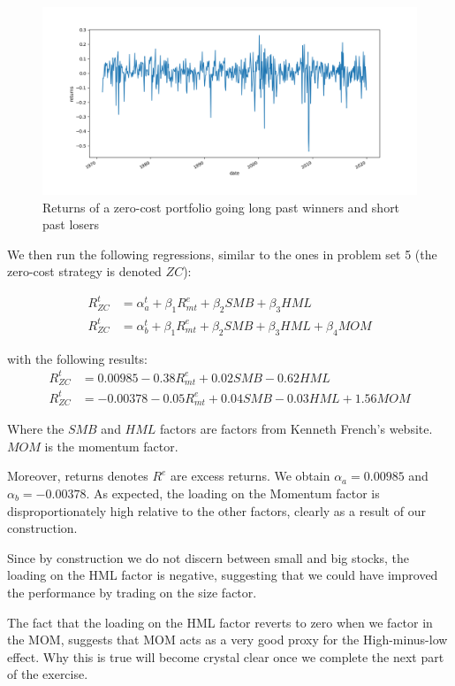 \documentclass[10pt]{article}
\begin{document}
\begin{figure}[h]
    \centering
    \includegraphics[scale=0.5]{ps8_ex2_plot1.png}
    \caption{Returns of a zero-cost portfolio going long past winners and short past losers}
    \label{ps8_ex2_plot1}    
\end{figure}

We then run the following regressions, similar to the ones in problem set 5 (the zero-cost strategy is denoted $ZC$):

\begin{align*}	
	R^t_{ZC} &= \alpha^t_a +  \beta_1 R^e_{mt} + \beta_2 SMB + \beta_3 HML \\
	R^t_{ZC}  &= \alpha^t_b + \beta_1 R^e_{mt} + \beta_2 SMB + \beta_3 HML + \beta_4 MOM
\end{align*}  

with the following results:
\begin{align*}	
	R^t_{ZC} &= 0.00985 - 0.38 R^e_{mt} + 0.02 SMB -0.62 HML \\
	R^t_{ZC}  &= -0.00378 -0.05 R^e_{mt} + 0.04 SMB -0.03 HML + 1.56 MOM
\end{align*}  

Where the $SMB$ and $HML$ factors are factors from Kenneth French’s website.
$MOM$ is the momentum factor.

Moreover, returns denotes $R^e$ are excess returns. We obtain $\alpha_{a} = 0.00985$ and $\alpha_{b} = -0.00378$.   
As expected, the loading on the Momentum factor is disproportionately high
relative to the other factors, clearly as a result of our construction.

Since by construction we do not discern between small and big stocks, the
loading on the HML factor is negative, suggesting that we could have improved
the performance by trading on the size factor.

The fact
that the loading on the HML factor reverts to zero when we factor in the MOM,
suggests that MOM acts as a very good proxy for the High-minus-low effect. Why
this is true will become crystal clear once we complete the next part of the exercise.
   
\end{document}
